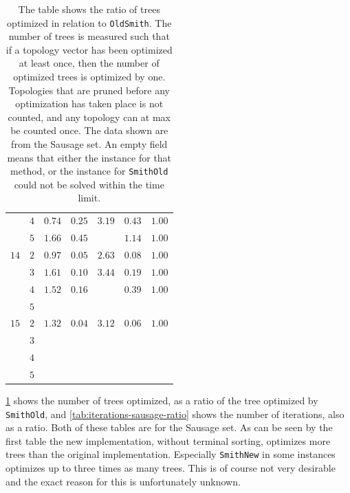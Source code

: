 \begin{table}[htbp]
{\begin{tabular}{ccccccc}
         & $4$ & $0.74$ & $0.25$ & $3.19$ & $0.43$ & $1.00$ \\
         & $5$ & $1.66$ & $0.45$ &        & $1.14$ & $1.00$ \\
    \cmidrule(r){1-2}
    $14$ & $2$ & $0.97$ & $0.05$ & $2.63$ & $0.08$ & $1.00$ \\
         & $3$ & $1.61$ & $0.10$ & $3.44$ & $0.19$ & $1.00$ \\
         & $4$ & $1.52$ & $0.16$ &        & $0.39$ & $1.00$ \\
         & $5$ &        &        &        &        &        \\
    \cmidrule(r){1-2}
    $15$ & $2$ & $1.32$ & $0.04$ & $3.12$ & $0.06$ & $1.00$ \\
         & $3$ &        &        &        &        &        \\
         & $4$ &        &        &        &        &        \\
         & $5$ &        &        &        &        &        \\
    \bottomrule
  \end{tabular}
  }
  \caption[Tree-exploration ratio for Sausage]{The table shows the ratio of
    trees optimized in relation to \texttt{OldSmith}. The number of trees is
    measured such that if a topology vector has been optimized at least once,
    then the number of optimized trees is optimized by one. Topologies that are
    pruned before any optimization has taken place is not counted, and any
    topology can at max be counted once. The data shown are from the Sausage
    set. An empty field means that either the instance for that method, or the
    instance for \texttt{SmithOld} could not be solved within the time limit.\label{tab:trees-sausage-ratio}}
\end{table}

\cref{tab:trees-sausage-ratio} shows the number of trees optimized, as a ratio
of the tree optimized by \texttt{SmithOld}, and
\cref{tab:iterations-sausage-ratio} shows the number of iterations, also as a
ratio. Both of these tables are for the Sausage set. As can be seen by the first
table the new implementation, without terminal sorting, optimizes more trees
than the original implementation. Especially \texttt{SmithNew} in some instances
optimizes up to three times as many trees. This is of course not very desirable
and the exact reason for this is unfortunately unknown.

